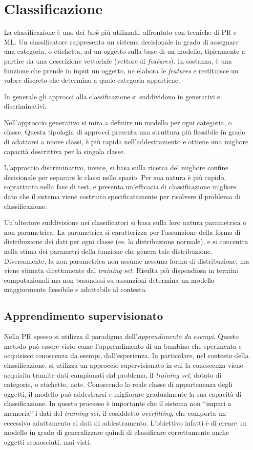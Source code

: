 \section{Classificazione}
La classificazione è uno dei \textit{task} più utilizzati, affrontato con tecniche di PR e ML. Un
classificatore rappresenta un sistema decisionale in grado di assegnare una categoria, o
etichetta, ad un oggetto sulla base di un modello, tipicamente a partire da una descrizione
vettoriale (vettore di \textit{features}). In sostanza, è una funzione che prende in input un oggetto, ne
elabora le \textit{features} e restituisce un valore discreto che determina a quale categoria appartiene.

In generale gli approcci alla classificazione si suddividono in generativi e discriminativi.

Nell’approccio generativo si mira a definire un modello per ogni categoria, o classe. Questa
tipologia di approcci presenta una struttura più flessibile in grado di adattarsi a nuove classi, è
più rapida nell’addestramento e ottiene una migliore capacità descrittiva per la singola classe.

L’approccio discriminativo, invece, si basa sulla ricerca del migliore confine decisionale per
separare le classi nello spazio. Per sua natura è più rapido, soprattutto nella fase di test, e
presenta un'efficacia di classificazione migliore dato che il sistema viene costruito
specificatamente per risolvere il problema di classificazione.

Un'ulteriore suddivisione nei classificatori si basa sulla loro natura parametrica o non
parametrica. La parametrica si caratterizza per l’assunzione della forma di distribuzione dei
dati per ogni classe (es. la distribuzione normale), e si concentra nella stima dei parametri
della funzione che genera tale distribuzione. Diversamente, la non parametrica non assume
nessuna forma di distribuzione, ma viene stimata direttamente dal \textit{training set}. Risulta più
dispendiosa in termini computazionali ma non basandosi su assunzioni determina un modello
maggiormente flessibile e adattabile al contesto.

\subsection{Apprendimento supervisionato}
Nella PR spesso si utilizza il paradigma dell’\textit{apprendimento da esempi}. Questo metodo può
essere visto come l’apprendimento di un bambino che sperimenta e acquisisce conoscenza da
esempi, dall’esperienza. In particolare, nel contesto della classificazione, si utilizza un
approccio supervisionato in cui la conoscenza viene acquisita tramite dati campionati dal
problema, il \textit{training set}, dotato di categorie, o etichette, note. Conoscendo la reale classe di
appartenenza degli oggetti, il modello può addestrarsi e migliorare gradualmente la sua
capacità di classificazione. In questo processo è importante che il sistema non “impari a
memoria” i dati del \textit{training set}, il cosiddetto \textit{overfitting}, che comporta un eccessivo
adattamento ai dati di addestramento. L’obiettivo infatti è di creare un modello in grado di
generalizzare quindi di classificare correttamente anche oggetti sconosciuti, mai visti.

